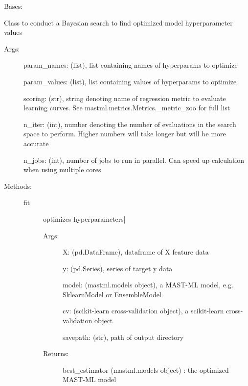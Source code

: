\documentclass[letterpaper,10pt,english]{sphinxmanual}
\begin{document}
\begin{fulllineitems}
\label{\detokenize{api/mastml.hyper_opt.BayesianSearch:mastml.hyper_opt.BayesianSearch}}
Bases: {\hyperref[\detokenize{api/mastml.hyper_opt.HyperOptUtils:mastml.hyper_opt.HyperOptUtils}]{}}

Class to conduct a Bayesian search to find optimized model hyperparameter values
\begin{description}
\item[{Args:}] \leavevmode
param\_names: (list), list containing names of hyperparams to optimize

param\_values: (list), list containing values of hyperparams to optimize

scoring: (str), string denoting name of regression metric to evaluate learning curves. See mastml.metrics.Metrics.\_metric\_zoo for full list

n\_iter: (int), number denoting the number of evaluations in the search space to perform. Higher numbers will take longer but will be more accurate

n\_jobs: (int), number of jobs to run in parallel. Can speed up calculation when using multiple cores

\item[{Methods:}] \leavevmode\begin{description}
\item[{fit}] \leavevmode{[}optimizes hyperparameters{]}\begin{description}
\item[{Args:}] \leavevmode
X: (pd.DataFrame), dataframe of X feature data

y: (pd.Series), series of target y data

model: (mastml.models object), a MAST-ML model, e.g. SklearnModel or EnsembleModel

cv: (scikit-learn cross-validation object), a scikit-learn cross-validation object

savepath: (str), path of output directory

\item[{Returns:}] \leavevmode
best\_estimator (mastml.models object) : the optimized MAST-ML model


\end{description}
\end{description}
\end{description}
\end{fulllineitems}
\end{document}
